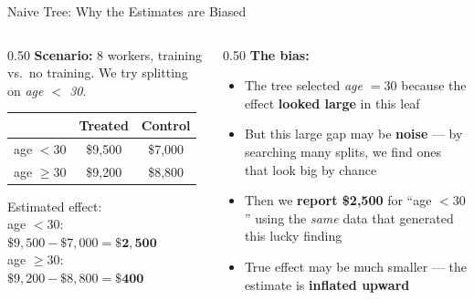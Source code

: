 \documentclass[hyperref={pdfpagelabels=false}]{beamer}
\begin{document}
\begin{frame}{Naive Tree: Why the Estimates are Biased}
\begin{columns}[T]
	\begin{column}{0.50\textwidth}
		\small
		\textbf{Scenario:} 8 workers, training vs.\ no training.
		We try splitting on \textit{age $<$ 30}.

		\vspace{0.4cm}
		\begin{tabular}{lcc}
			\toprule
			 & Treated & Control \\
			\midrule
			age $< 30$ & \$9,500 & \$7,000 \\
			age $\geq 30$ & \$9,200 & \$8,800 \\
			\bottomrule
		\end{tabular}

		\vspace{0.4cm}
		\footnotesize
		Estimated effect:\\[3pt]
		\quad age $< 30$: $\$9{,}500 - \$7{,}000 = \mathbf{\$2{,}500}$\\[3pt]
		\quad age $\geq 30$: $\$9{,}200 - \$8{,}800 = \mathbf{\$400}$
	\end{column}
	\begin{column}{0.50\textwidth}
		\small
		\textbf{The bias:}
		\vspace{0.2cm}
		\begin{itemize}
			\item The tree selected \textit{age $= 30$} because the effect \textbf{looked large} in this leaf
			\vspace{0.2cm}
			\item But this large gap may be \textbf{noise} --- by searching many splits, we find ones that look big by chance
			\vspace{0.2cm}
			\item Then we \textbf{report \$2,500} for ``age $< 30$'' using the \textit{same} data that generated this lucky finding
			\vspace{0.2cm}
			\item True effect may be much smaller --- the estimate is \textbf{inflated upward}
		\end{itemize}
	\end{column}
\end{columns}
\end{frame}
\end{document}
